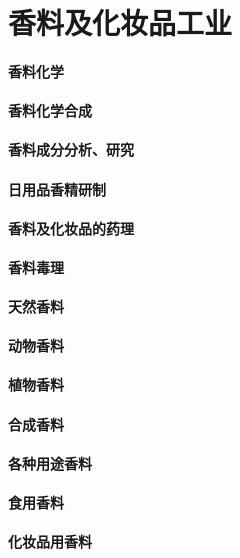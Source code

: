 \documentclass[UTF8]{../../ApplicationUniverse}
\begin{document}
\chapter{香料及化妆品工业}
\subsubsection{香料化学}
    \subsubsection{香料化学合成}
    \subsubsection{香料成分分析、研究}
    \subsubsection{日用品香精研制}
\subsubsection{香料及化妆品的药理}
\subsubsection{香料毒理}
\subsubsection{天然香料}
    \subsubsection{动物香料}
    \subsubsection{植物香料}
\subsubsection{合成香料}
\subsubsection{各种用途香料}
    \subsubsection{食用香料}
    \subsubsection{化妆品用香料}
\end{document}
